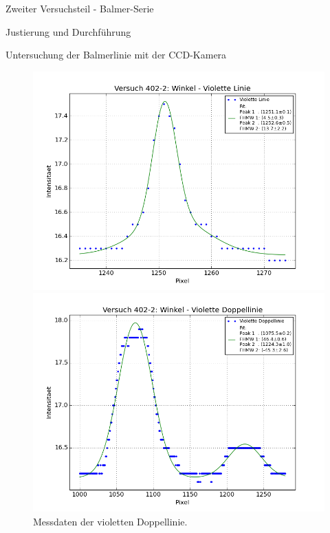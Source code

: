 \documentclass[pdftex, a4paper,11pt, twoside, ngerman]{report}
\begin{document}
\begin{chapter}{Zweiter Versuchsteil - Balmer-Serie}
\begin{section}{Justierung und Durchführung}
\begin{subsection}{Untersuchung der Balmerlinie mit der CCD-Kamera}
\begin{figure}[ht!]
        \begin{minipage}{0.48\textwidth}
          \centering
          \includegraphics[width=\textwidth]
              {Figures/Versuch402_2_VioletteLinie.png}
          \caption{Messdaten der violette Linie.}
          \label{fig:Versuch402_2_VioletteLinie}
        \end{minipage}\quad
        \begin{minipage}{0.48\textwidth}
          \centering
          \includegraphics[width=\textwidth]
              {Figures/Versuch402_2_VioletteDoppellinie.png}
          \caption{Messdaten der violetten Doppellinie.}
          \label{fig:Versuch402_2_VioletteDoppellinie}
        \end{minipage}
      \end{figure}


\end{subsection}
\end{section}
\end{chapter}
\end{document}
